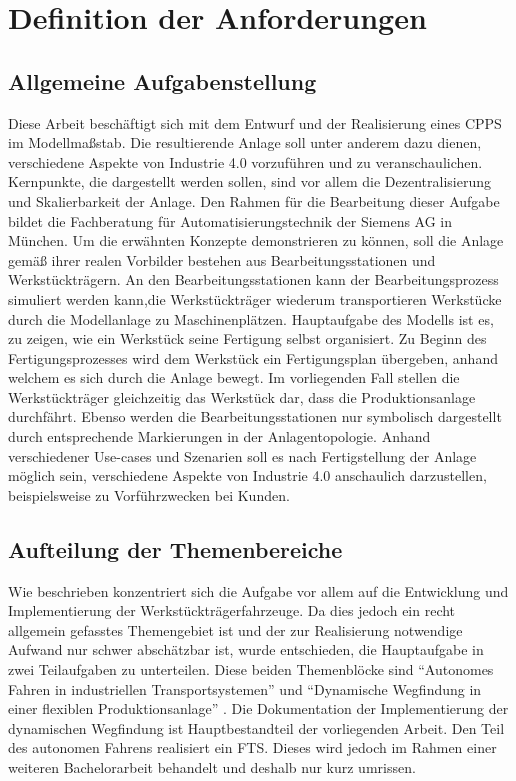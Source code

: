 \chapter{Definition der Anforderungen}
\label{Anforderungen}
\section{Allgemeine Aufgabenstellung}
	\label{Alg._Aufgabenstellung}
	Diese Arbeit beschäftigt sich mit dem Entwurf und der Realisierung eines \ac{CPPS} im Modellmaßstab. Die resultierende Anlage soll unter anderem dazu dienen, verschiedene Aspekte von Industrie 4.0 vorzuführen und zu veranschaulichen. Kernpunkte, die dargestellt werden sollen, sind vor allem die Dezentralisierung und Skalierbarkeit der Anlage. Den Rahmen für die Bearbeitung dieser Aufgabe bildet die Fachberatung für Automatisierungstechnik der Siemens AG in München. Um die erwähnten Konzepte demonstrieren zu können, soll die Anlage gemäß ihrer realen Vorbilder bestehen aus Bearbeitungsstationen und Werkstückträgern. An den Bearbeitungsstationen kann der Bearbeitungsprozess simuliert werden kann,die Werkstückträger wiederum transportieren Werkstücke durch die Modellanlage zu Maschinenplätzen. Hauptaufgabe des Modells ist es, zu zeigen, wie ein Werkstück seine Fertigung selbst organisiert. Zu Beginn des Fertigungsprozesses wird dem Werkstück ein Fertigungsplan übergeben, anhand welchem es sich durch die Anlage bewegt. Im vorliegenden Fall stellen die Werkstückträger gleichzeitig das Werkstück dar, dass die Produktionsanlage durchfährt. Ebenso werden die Bearbeitungsstationen nur symbolisch dargestellt durch entsprechende Markierungen in der Anlagentopologie. Anhand verschiedener Use-cases und Szenarien soll es nach Fertigstellung der Anlage möglich sein, verschiedene Aspekte von Industrie 4.0 anschaulich darzustellen, beispielsweise zu Vorführzwecken bei Kunden.

\section{Aufteilung der Themenbereiche}

	Wie beschrieben konzentriert sich die Aufgabe vor allem auf die Entwicklung und Implementierung der Werkstückträgerfahrzeuge. Da dies jedoch ein recht allgemein gefasstes Themengebiet ist und der zur Realisierung notwendige Aufwand nur schwer abschätzbar ist, wurde entschieden, die Hauptaufgabe in zwei Teilaufgaben zu unterteilen. Diese beiden Themenblöcke sind "`Autonomes Fahren in industriellen Transportsystemen"' und "`Dynamische Wegfindung in einer flexiblen Produktionsanlage"' \cite{I40Modell}. Die Dokumentation der Implementierung der dynamischen Wegfindung ist Hauptbestandteil der vorliegenden Arbeit. Den Teil des autonomen Fahrens realisiert ein \ac{FTS}. Dieses wird jedoch im Rahmen einer weiteren Bachelorarbeit \cite{Meier16} behandelt und deshalb nur kurz umrissen.

